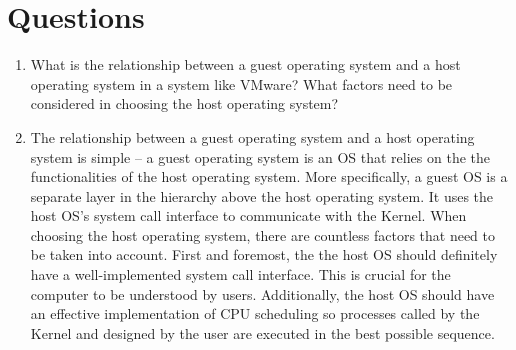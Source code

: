 \tableofcontents 
\newpage

\section{Questions}
    \begin{enumerate}
        \item What is the relationship between a guest operating system and a host operating system in a system like VMware? What factors need to be considered in choosing the host operating system?
        \item[] The relationship between a guest operating system and a host operating system is simple -- a guest operating system is an OS that relies on the the functionalities of the host operating system. More specifically, a guest OS is a separate layer in the hierarchy above the host operating system. It uses the host OS's system call interface to communicate with the Kernel. When choosing the host operating system, there are countless factors that need to be taken into account. First and foremost, the the host OS should definitely have a well-implemented system call interface. This is crucial for the computer to be understood by users. Additionally, the host OS should have an effective implementation of CPU scheduling so processes called by the Kernel and designed by the user are executed in the best possible sequence.  
    \end{enumerate}

